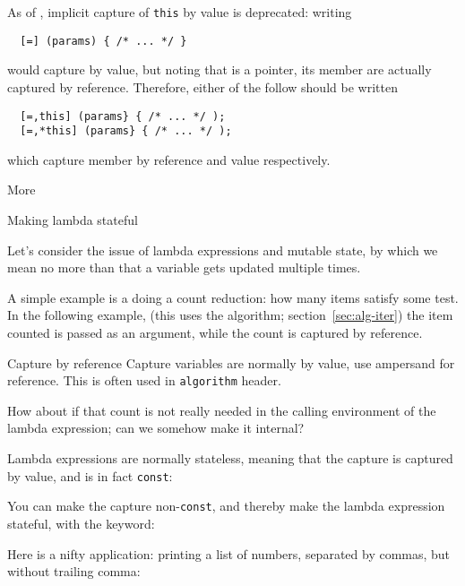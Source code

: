 As of , implicit capture of \lstinline{this} by value
is deprecated: writing
\begin{lstlisting}
  [=] (params) { /* ... */ }
\end{lstlisting}
would capture  by value, but noting that 
is a pointer, its member are actually captured by reference.
Therefore, either of the follow should be written
\begin{lstlisting}
  [=,this] (params} { /* ... */ );
  [=,*this] (params} { /* ... */ );
\end{lstlisting}
which capture member by reference and value respectively.

 {More}

 {Making lambda stateful}

Let's consider the issue of lambda expressions and mutable state,
by which we mean no more than that a variable gets updated
multiple times.

A simple example is a doing a count reduction:
how many items satisfy some test.
In the following example,
(this uses the  algorithm; section~\ref{sec:alg-iter})
the item counted is passed as an argument,
while the count is captured by reference.


\begin{slide}{Capture by reference}
  \label{sl:lambda-count}
  Capture variables are normally by value,
  use ampersand for reference.
  This is often used in \lstinline{algorithm} header.
\end{slide}

How about if that count is not really needed
in the calling environment of the lambda expression;
can we somehow make it internal?

Lambda expressions are normally stateless,
meaning that the capture is captured by value,
and is in fact \lstinline{const}:


You can make the capture non-\lstinline{const},
and thereby make the lambda expression stateful,
with the  keyword:


Here is a nifty application: printing a list of numbers,
separated by commas, but without trailing comma:
%

